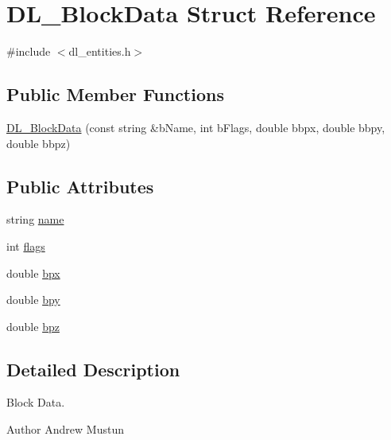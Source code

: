 \hypertarget{structDL__BlockData}{\section{D\-L\-\_\-\-Block\-Data Struct Reference}
\label{structDL__BlockData}
}


{\ttfamily \#include $<$dl\-\_\-entities.\-h$>$}

\subsection*{Public Member Functions}
\begin{DoxyCompactItemize}
\item 
\hyperlink{structDL__BlockData_abfa7348d9481252b45e045a1f372ef43}{D\-L\-\_\-\-Block\-Data} (const string \&b\-Name, int b\-Flags, double bbpx, double bbpy, double bbpz)
\end{DoxyCompactItemize}
\subsection*{Public Attributes}
\begin{DoxyCompactItemize}
\item 
string \hyperlink{structDL__BlockData_aaaee8da19181420398d6989c08be6d22}{name}
\item 
int \hyperlink{structDL__BlockData_a659ccdb0d78310e9a7aa1d254165d157}{flags}
\item 
double \hyperlink{structDL__BlockData_aaf0007a77910f48d0ddc68c87cf32954}{bpx}
\item 
double \hyperlink{structDL__BlockData_ad535616da7e489d8169675d17e27ea3a}{bpy}
\item 
double \hyperlink{structDL__BlockData_a2d68f5c359af30ce008a5c60999745cc}{bpz}
\end{DoxyCompactItemize}


\subsection{Detailed Description}
Block Data.

\begin{DoxyAuthor}{Author}
Andrew Mustun 
\end{DoxyAuthor}



